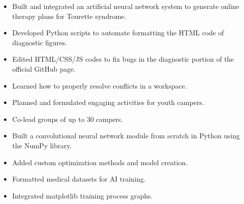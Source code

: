\documentclass[10pt,a4paper,ragged2e,withhyper]{altacv}
\begin{document}


\makecvheader


\begin{paracol}{2}


\begin{itemize}
\item Built and integrated an artificial neural network system to \newline generate online therapy plans for Tourette syndrome.
\item Developed Python scripts to automate formatting the HTML code of diagnostic figures.
\item Edited HTML/CSS/JS codes to fix bugs in the diagnostic portion of the official GitHub page.
\end{itemize}

\divider

\begin{itemize}
\item Learned how to properly resolve conflicts in a workspace. 
\item Planned and formulated engaging activities for youth campers.
\item Co-lead groups of up to 30 campers.
\end{itemize}


\begin{itemize}
\item Built a convolutional neural network module from scratch in Python using the NumPy library.
\item Added custom optimization methods and model creation.
\item Formatted medical datasets for AI training.
\item Integrated matplotlib training process graphs.
\end{itemize}

\divider


\end{paracol}
\end{document}
